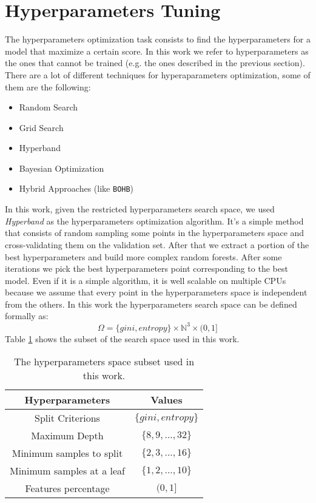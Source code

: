 \documentclass[11pt, a4paper]{article}
\begin{document}
\section{Hyperparameters Tuning}
  The hyperparameters optimization task consists to find the hyperparameters for a model that maximize a certain score. In this work we refer to hyperparameters as the ones that cannot be trained (e.g. the ones described in the previous section).
  There are a lot of different techniques for hyperaparameters optimization, some of them are the following:
  \begin{itemize}
    \item Random Search
    \item Grid Search
    \item Hyperband
    \item Bayesian Optimization
    \item Hybrid Approaches (like \texttt{BOHB})
  \end{itemize}
  In this work, given the restricted hyperparameters search space, we used \textit{Hyperband} as the hyperparameters optimization algorithm. It's a simple method that consists of random sampling some points in the hyperparameters space and cross-validating them on the validation set. After that we extract a portion of the best hyperparameters and build more complex random forests. After some iterations we pick the best hyperparameters point corresponding to the best model.
  Even if it is a simple algorithm, it is well scalable on multiple CPUs because we assume that every point in the hyperparameters space is independent from the others.
  In this work the hyperparameters search space can be defined formally as:
  \[\Omega = \{gini, entropy\} \times \mathbb{N}^{3} \times (0, 1]\]
  Table \ref{table:hyperparameters} shows the subset of the search space used in this work.

  \begin{table}
    \centering
    \begin{tabular}{|c c|}
      \hline
      Hyperparameters & Values \\
      \hline\hline
      Split Criterions & $\{gini, entropy\}$ \\
      \hline
      Maximum Depth & $\{8,9,...,32\}$ \\
      \hline
      Minimum samples to split & $\{2,3,...,16\}$ \\
      \hline
      Minimum samples at a leaf & $\{1,2,...,10\}$ \\
      \hline
      Features percentage & $(0, 1]$ \\
      \hline
    \end{tabular}
    \caption{The hyperparameters space subset used in this work.}
    \label{table:hyperparameters}
  \end{table}
\end{document}
